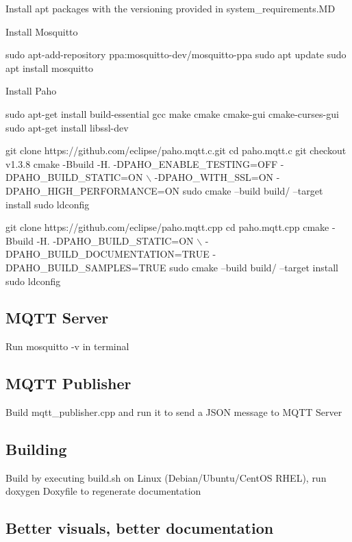 Install apt packages with the versioning provided in {\ttfamily system\+\_\+requirements.\+MD}

Install Mosquitto


\begin{DoxyCode}
sudo apt-add-repository ppa:mosquitto-dev/mosquitto-ppa
sudo apt update
sudo apt install mosquitto
\end{DoxyCode}


Install Paho


\begin{DoxyCode}
sudo apt-get install build-essential gcc make cmake cmake-gui cmake-curses-gui
sudo apt-get install libssl-dev


git clone https://github.com/eclipse/paho.mqtt.c.git
cd paho.mqtt.c
git checkout v1.3.8
cmake -Bbuild -H. -DPAHO\_ENABLE\_TESTING=OFF -DPAHO\_BUILD\_STATIC=ON \(\backslash\)
    -DPAHO\_WITH\_SSL=ON -DPAHO\_HIGH\_PERFORMANCE=ON
sudo cmake --build build/ --target install
sudo ldconfig


git clone https://github.com/eclipse/paho.mqtt.cpp
cd paho.mqtt.cpp
cmake -Bbuild -H. -DPAHO\_BUILD\_STATIC=ON \(\backslash\)
    -DPAHO\_BUILD\_DOCUMENTATION=TRUE -DPAHO\_BUILD\_SAMPLES=TRUE
sudo cmake --build build/ --target install
sudo ldconfig
\end{DoxyCode}


\subsection*{M\+Q\+TT Server}

Run {\ttfamily mosquitto -\/v} in terminal

\subsection*{M\+Q\+TT Publisher}

Build {\ttfamily mqtt\+\_\+publisher.\+cpp} and run it to send a J\+S\+ON message to M\+Q\+TT Server

\subsection*{Building}

Build by executing build.\+sh on Linux (Debian/\+Ubuntu/\+Cent\+OS R\+H\+EL), run {\ttfamily doxygen Doxyfile} to regenerate documentation

\subsection*{Better visuals, better documentation}

